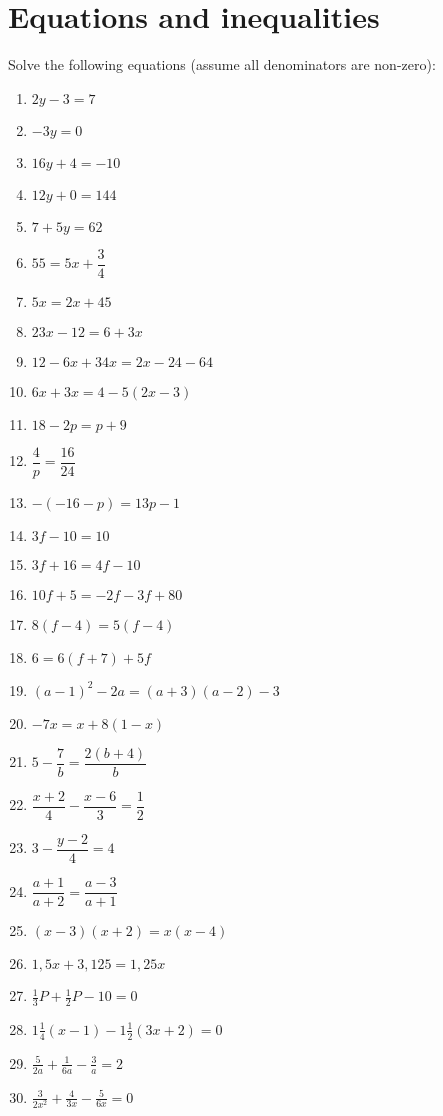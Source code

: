 \chapter{Equations and inequalities}

\begin{exercises}{}
{
Solve the following equations (assume all denominators are non-zero): \\
\begin{multicols}{2}
\begin{enumerate}[itemsep=5pt, label=\textbf{\arabic*}. ] 
\item   $2y-3=7$
\item   $-3y=0$        
\item   $16y+4=-10$        
\item   $12y+0=144$
\item   $7+5y=62$       
\item  $55=5x+\dfrac{3}{4}$ 
\item   $5x=2x+45$        
\item  $23x-12=6+3x$
\item   $12-6x+34x=2x-24-64$
\item   $6x+3x=4-5(2x-3)$
\item   $18-2p=p+9$   
\item   $\dfrac{4}{p}=\dfrac{16}{24}$
\item   $-(-16-p)=13p-1$
\item   $3f-10=10$
\item   $3f+16=4f-10$
\item   $10f+5=-2f-3f+80$
\item   $8(f-4)=5(f-4)$
\item  $6=6(f+7)+5f$      
\item $(a-1)^{2} - 2a = (a+3)(a-2) - 3$
\item $-7x = x+8(1-x)$ 
\item $5-\dfrac{7}{b} = \dfrac{2(b+4)}{b}$
\item $\dfrac{x+2}{4} - \dfrac{x-6}{3} = \dfrac{1}{2}$
\item $ 3 - \dfrac{y-2}{4} = 4$
\item $ \dfrac{a+1}{a+2} = \dfrac{a-3}{a+1}$
\item $(x-3)(x+2)=x(x-4)$
\item $1,5x+3,125=1,25x$
\item $\frac{1}{3}P + \frac{1}{2}P - 10 = 0$
\item $1 \frac{1}{4} (x-1)-1\frac{1}{2}(3x+2)=0$
\item $\frac{5}{2a}+\frac{1}{6a}-\frac{3}{a}=2$
\item $\frac{3}{2x^2}+\frac{4}{3x}-\frac{5}{6x}=0$  
\end{enumerate}
\end{multicols}

}
\end{exercises}


